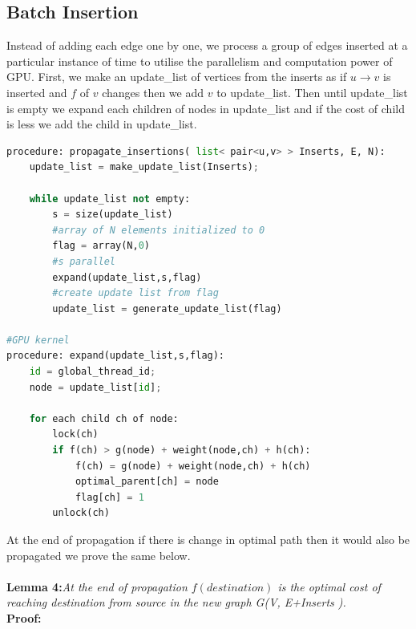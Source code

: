 \documentclass[a4paper]{article}
\begin{document}
\subsection{Batch Insertion}

Instead of adding each edge one by one, we process a group of edges inserted at a particular instance of time to utilise the parallelism and computation power of GPU. First, we make an update\_list of vertices from the inserts as if $u \rightarrow v $ is inserted and $f$ of $v$ changes then we add $v$ to update\_list. Then until update\_list is empty we expand each children of nodes in update\_list and if the cost of child is less we add the child in update\_list.
\begin{lstlisting}[language=python, caption=Propagation of Insertions]
procedure: propagate_insertions( list< pair<u,v> > Inserts, E, N):
    update_list = make_update_list(Inserts);
                          
    while update_list not empty:
        s = size(update_list)
        #array of N elements initialized to 0
        flag = array(N,0)
        #s parallel
        expand(update_list,s,flag)
        #create update list from flag
        update_list = generate_update_list(flag)
        
#GPU kernel
procedure: expand(update_list,s,flag):
    id = global_thread_id;
    node = update_list[id];
    
    for each child ch of node:
        lock(ch)
        if f(ch) > g(node) + weight(node,ch) + h(ch):
            f(ch) = g(node) + weight(node,ch) + h(ch)  
            optimal_parent[ch] = node
            flag[ch] = 1
        unlock(ch)


\end{lstlisting}

At the end of propagation if there is change in optimal path then it would also be propagated we prove the same below.\\
\\
\textbf{Lemma 4:}\textit{At the end of propagation $f(destination)$ is the optimal cost of reaching destination from source in the new graph G(V, E+Inserts ).}\\
\textbf{Proof:}
\\
\end{document}

